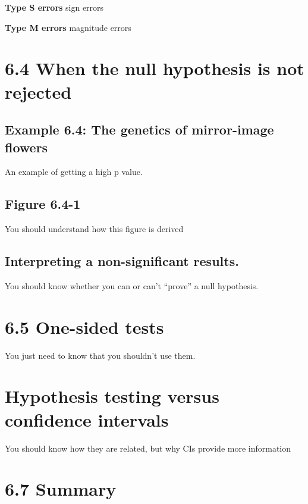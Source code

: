 \documentclass[]{book}
\theoremstyle{definition}
\theoremstyle{definition}
\theoremstyle{definition}
\theoremstyle{remark}
\begin{document}
\textbf{Type S errors} sign errors

\textbf{Type M errors} magnitude errors

\section{6.4 When the null hypothesis is not
rejected}\label{when-the-null-hypothesis-is-not-rejected}

\subsection{Example 6.4: The genetics of mirror-image
flowers}\label{example-6.4-the-genetics-of-mirror-image-flowers}

An example of getting a high p value.

\subsection{Figure 6.4-1}\label{figure-6.4-1}

You should understand how this figure is derived

\subsection{Interpreting a non-significant
results.}\label{interpreting-a-non-significant-results.}

You should know whether you can or can't ``prove'' a null hypothesis.

\section{6.5 One-sided tests}\label{one-sided-tests}

You just need to know that you shouldn't use them.

\section{Hypothesis testing versus confidence
intervals}\label{hypothesis-testing-versus-confidence-intervals}

You should know how they are related, but why CIs provide more
information

\section{6.7 Summary}\label{summary-3}
\end{document}
